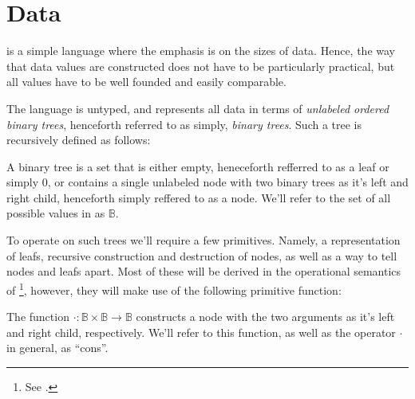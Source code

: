\section{Data}

\D{} is a simple language where the emphasis is on the sizes of data. Hence,
the way that data values are constructed does not have to be particularly
practical, but all values have to be well founded and easily comparable.

The language \D{} is untyped, and represents all data in terms of
\emph{unlabeled ordered binary trees}, henceforth referred to as simply,
\emph{binary trees}. Such a tree is recursively defined as follows:

\begin{definition}

A binary tree is a set that is either empty, heneceforth refferred to as a leaf
or simply $0$, or contains a single unlabeled node with two binary trees as
it's left and right child, henceforth simply reffered to as a node. We'll refer
to the set of all possible values in \D{} as $\mathbb{B}$.

\end{definition}

To operate on such trees we'll require a few primitives. Namely, a
representation of leafs, recursive construction and destruction of nodes, as
well as a way to tell nodes and leafs apart. Most of these will be derived in
the operational semantics of \D{}\footnote{See .},
however, they will make use of the following primitive function:

\begin{definition}

The function $\cdot :\mathbb{B}\times\mathbb{B}\rightarrow\mathbb{B}$
constructs a node with the two arguments as it's left and right child,
respectively. We'll refer to this function, as well as the operator $\cdot$ in
general, as ``cons''. 

\end{definition}

